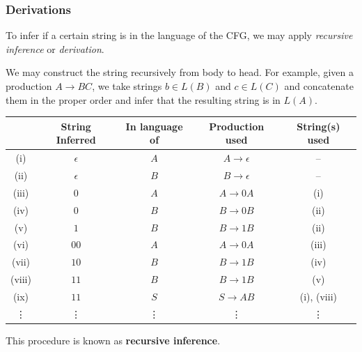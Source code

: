 \subsubsection{Derivations}
To infer if a certain string is in the language of the CFG, we may apply
\textit{recursive inference} or \textit{derivation}.
\begin{definition}
  We may construct the string recursively from body to head. For example, given
  a production $A\to BC$, we take strings $b\in L(B)$ and $c\in L(C)$ and
  concatenate them in the proper order and infer that the resulting string is
  in $L(A)$.

  \centering
\begin{tabular}{ccccc}
   \toprule
   & String Inferred & In language of & Production used & String(s) used \\
   \midrule
  (i) & $\epsilon$ & $A$ & $A\to\epsilon$ & -- \\
  (ii) & $\epsilon$ & $B$ & $B\to\epsilon$ & -- \\
  (iii) & $0$ & $A$ & $A\to 0A$ & (i) \\
  (iv) & $0$ & $B$ & $B\to 0B$ & (ii) \\
  (v) & $1$ & $B$ & $B\to 1B$ & (ii) \\
  (vi) & $00$ & $A$ & $A\to 0A$ & (iii) \\
  (vii) & $10$ & $B$ & $B\to 1B$ & (iv) \\
  (viii) & $11$ & $B$ & $B\to 1B$ & (v) \\
  (ix) & $11$ & $S$ & $S\to AB$ & (i), (viii) \\
  \vdots & \vdots & \vdots & \vdots & \vdots\\
  \bottomrule
\end{tabular}

\raggedright
\vspace{2mm}
This procedure is known as \textbf{recursive inference}.
\end{definition}

